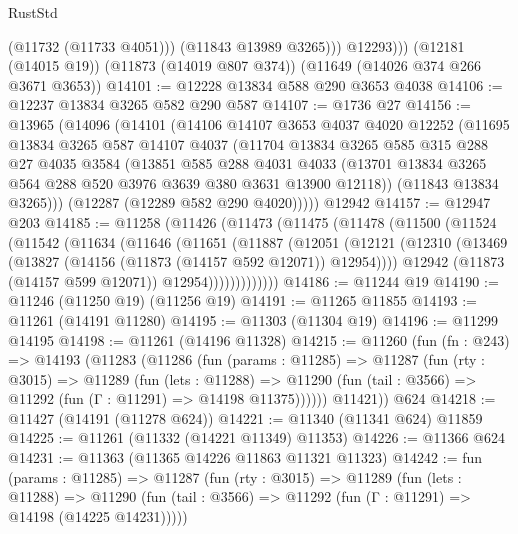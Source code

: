 \begin{lexlean}{RustStd}
\begin{coremodule}
                (@11732 (@11733 @4051)))
              (@11843 @13989 @3265)))
          @12293)))
    (@12181 (@14015 @19))
    (@11873 (@14019 @807 @374))
    (@11649 (@14026 @374 @266 @3671 @3653))
@14101 := @12228 @13834 @588 @290 @3653 @4038
@14106 := @12237 @13834 @3265 @582 @290 @587
@14107 := @1736 @27
@14156 := @13965
    (@14096
      (@14101
        (@14106
          @14107
          @3653
          @4037
          @4020
          @12252
          (@11695
            @13834
            @3265
            @587
            @14107
            @4037
            (@11704
              @13834
              @3265
              @585
              @315
              @288
              @27
              @4035
              @3584
              (@13851
                @585
                @288
                @4031
                @4033
                (@13701 @13834 @3265 @564 @288 @520 @3976 @3639 @380 @3631 @13900 @12118))
              (@11843 @13834 @3265)))
          (@12287 (@12289 @582 @290 @4020)))))
    @12942
@14157 := @12947 @203
@14185 := @11258
    (@11426
      (@11473
        (@11475
          (@11478
            (@11500
              (@11524
                (@11542
                  (@11634
                    (@11646
                      (@11651
                        (@11887
                          (@12051
                            (@12121
                              (@12310
                                (@13469 (@13827 (@14156 (@11873 (@14157 @592 @12071)) @12954))))
                              @12942
                              (@11873 (@14157 @599 @12071))
                              @12954)))))))))))))
@14186 := @11244 @19
@14190 := @11246 (@11250 @19) (@11256 @19)
@14191 := @11265 @11855
@14193 := @11261 (@14191 @11280)
@14195 := @11303 (@11304 @19)
@14196 := @11299 @14195
@14198 := @11261 (@14196 @11328)
@14215 := @11260
    (fun (fn : @243) =>
    @14193
      (@11283
        (@11286
          (fun (params : @11285) =>
          @11287
            (fun (rty : @3015) =>
            @11289
              (fun (lets : @11288) =>
              @11290 (fun (tail : @3566) => @11292 (fun (Γ : @11291) => @14198 @11375))))))
        @11421))
    @624
@14218 := @11427 (@14191 (@11278 @624))
@14221 := @11340 (@11341 @624) @11859
@14225 := @11261 (@11332 (@14221 @11349) @11353)
@14226 := @11366 @624
@14231 := @11363 (@11365 @14226 @11863 @11321 @11323)
@14242 := fun (params : @11285) =>
  @11287
    (fun (rty : @3015) =>
    @11289
      (fun (lets : @11288) =>
      @11290 (fun (tail : @3566) => @11292 (fun (Γ : @11291) => @14198 (@14225 @14231)))))

\end{coremodule}
\end{lexlean}
